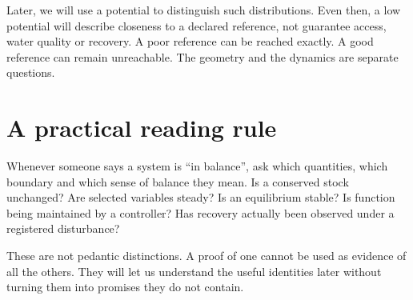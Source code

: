 Later, we will use a potential to distinguish such distributions. Even then, a low potential will describe closeness to a declared reference, not guarantee access, water quality or recovery. A poor reference can be reached exactly. A good reference can remain unreachable. The geometry and the dynamics are separate questions.

\section{A practical reading rule}
Whenever someone says a system is ``in balance'', ask which quantities, which boundary and which sense of balance they mean. Is a conserved stock unchanged? Are selected variables steady? Is an equilibrium stable? Is function being maintained by a controller? Has recovery actually been observed under a registered disturbance?

These are not pedantic distinctions. A proof of one cannot be used as evidence of all the others. They will let us understand the useful identities later without turning them into promises they do not contain.


